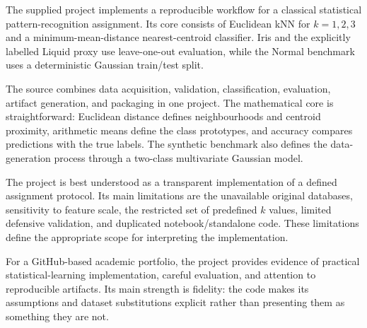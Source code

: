\documentclass[11pt,a4paper]{article}
\begin{document}
The supplied project implements a reproducible workflow for a classical statistical pattern-recognition assignment. Its core consists of Euclidean kNN for $k=1,2,3$ and a minimum-mean-distance nearest-centroid classifier. Iris and the explicitly labelled Liquid proxy use leave-one-out evaluation, while the Normal benchmark uses a deterministic Gaussian train/test split.

The source combines data acquisition, validation, classification, evaluation, artifact generation, and packaging in one project. The mathematical core is straightforward: Euclidean distance defines neighbourhoods and centroid proximity, arithmetic means define the class prototypes, and accuracy compares predictions with the true labels. The synthetic benchmark also defines the data-generation process through a two-class multivariate Gaussian model.

The project is best understood as a transparent implementation of a defined assignment protocol. Its main limitations are the unavailable original databases, sensitivity to feature scale, the restricted set of predefined $k$ values, limited defensive validation, and duplicated notebook/standalone code. These limitations define the appropriate scope for interpreting the implementation.

For a GitHub-based academic portfolio, the project provides evidence of practical statistical-learning implementation, careful evaluation, and attention to reproducible artifacts. Its main strength is fidelity: the code makes its assumptions and dataset substitutions explicit rather than presenting them as something they are not.
\end{document}
